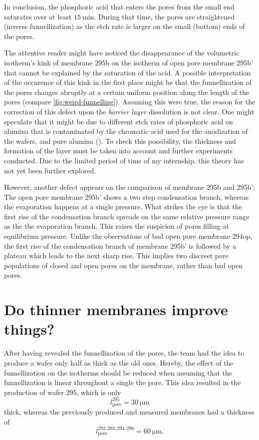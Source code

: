 \documentclass[../thesis.tex]{subfiles}
\begin{document}
          In conclusion, the phosphoric acid that enters the pores from the small end saturates over at least $\SI{15}{\minute}$. During that time, the pores are straightened (inverse funnellization) as the etch rate is larger on the small (bottom) ends of the pores.
          \medskip

          The attentive reader might have noticed the disappearance of the volumetric isotherm's kink of membrane 295b on the isotherm of open pore membrane 295b' that cannot be explained by the saturation of the acid. A possible interpretation of the occurence of this kink in the first place might be that the funnellization of the pores changes abruptly at a certain uniform position along the length of the pores (compare \cref{fig:weird-funnelling}). Assuming this were true, the reason for the correction of this defect upon the \textit{barrier layer} dissolution is not clear. One might speculate that it might be due to different etch rates of phosphoric acid on alumina that is contaminated by the chromatic acid used for the anodization of the wafers, and pure alumina (\cite{Rufolf-aam}). To check this possibility, the thickness and formation of the layer must be taken into account and further experiments conducted. Due to the limited period of time of my internship, this theory has not yet been further explored.
          \medskip

          However, another defect appears on the comparison of membrane 295b and 295b': The open pore membrane 295b' shows a two step condensation branch, whereas the evaporation happens at a single pressure. What strikes the eye is that the first rise of the condensation branch spreads on the same relative pressure range as the the evaporation branch. This raises the suspicion of pores filling at equilibrium pressure. Unlike the observations of bad open pore membrane 294op, the first rise of the condensation branch of membrane 295b' is followed by a plateau which leads to the next sharp rise. This implies two discreet pore populations of closed and open pores on the membrane, rather than bad open pores.

          


  \section{Do thinner membranes improve things?}
  \label{sec:thinner-membranes}

    After having revealed the funnellization of the pores, the team had the idea to produce a wafer only half as thick as the old ones. Hereby, the effect of the funnellization on the isotherms should be reduced when assuming that the funnellization is linear throughout a single the pore. This idea resulted in the production of wafer 295, which is only
    \begin{equation}
        l^{295}_\mathrm{pore}=\SI{30}{\micro\meter}
    \end{equation}
    thick, whereas the previously produced and measured membranes had a thickness of
    \begin{equation}
        l^{292,293,294,296}_\mathrm{pore}=\SI{60}{\micro\meter}.
    \end{equation}
\end{document}
